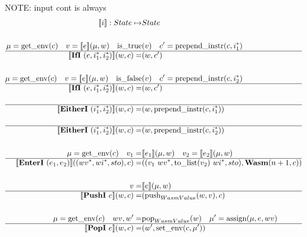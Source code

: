 



\newpage

NOTE: input cont is always \al
\begin{align*}
  \sem{i} : State \mapsto& State \\
%
\newline \\
  \mu = \text{get\_env}(c) \quad v = \sem{e}(\mu, w) \quad
  \text{is\_true}&(v) \quad c' = \text{prepend\_instr}(c, \seq{i_1}) \\
  \hline
  \sem{\ifi ~ (e, \seq{i_1}, \seq{i_2})}(w, c) =& (w, c') \\
%
\newline \\
  \mu = \text{get\_env}(c) \quad v = \sem{e}(\mu, w) \quad
  \text{is\_false}&(v) \quad c' = \text{prepend\_instr}(c, \seq{i_2}) \\
  \hline
  \sem{\ifi ~ (e, \seq{i_1}, \seq{i_2})}(w, c) =& (w, c') \\
%
\newline \\
  \hline
  \sem{\eitheri ~ (\seq{i_1}, \seq{i_2})}(w, c) =& (w, \text{prepend\_instr}(c, \seq{i_1})) \\
%
\newline \\
  \hline
  \sem{\eitheri ~ (\seq{i_1}, \seq{i_2})}(w, c) =& (w, \text{prepend\_instr}(c, \seq{i_2})) \\
%
\newline \\
  \mu = \text{get\_env}(c) \quad v_1 =& \sem{e_1}(\mu, w) \quad v_2 = \sem{e_2}(\mu, w) \\
  \hline
  \sem{\enteri ~ (e_1, e_2)}((\seq{wv}, \seq{wi}, sto), c)
  =&
  ((v_1 ~ \seq{wv}, \text{to\_list}(v_2) ~ \seq{wi}, sto), \wasm (n+1, c)) \\
%
\newline \\
  v =& \sem{e}(\mu, w) \\
  \hline
  \sem{\pushi ~ e}(w, c) =& (\text{push}_{WasmValue}(w, v), c) \\
%
\newline \\
  \mu = \text{get\_env}(c) \quad
  wv, w' =& \text{pop}_{WasmValue}(w) \quad
  \mu' = \text{assign}(\mu, e, wv) \\
  \hline
  \sem{\popi ~ e}(w, c) =& (w', \text{set\_env}(c, \mu')) \\

\end{align*}

